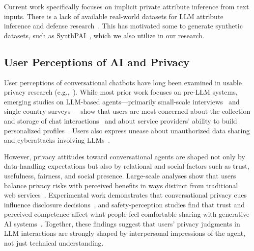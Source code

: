 Current work specifically focuses on implicit private attribute inference from text inputs. There is a lack of available real-world datasets for LLM attribute inference and defense research~\cite{staab2024beyond}. %
This has motivated some to generate synthetic datasets, such as SynthPAI~\cite{synthpai}, which we also utilize in our research. 


\subsection{User Perceptions of AI and Privacy}
User perceptions of conversational chatbots have long been examined in usable privacy research (e.g.,~\cite{chalhoub2020alexa, chametka2023security, belen2021privacy, ma2025privacy, zufferey2025ai}). While most prior work focuses on pre-LLM systems, emerging studies on LLM-based agents—primarily small-scale interviews~\cite{kimbel2024security, zhang2024s} and single-country surveys~\cite{malki2025hoovered, liu2025prevalence}—show that users are most concerned about the collection and storage of chat interactions~\cite{belen2021privacy, chametka2023security, kimbel2024security, zhang2024s, zhang2025understanding} and about service providers’ ability to build personalized profiles~\cite{liu2025prevalence, rescriber}. Users also express unease about unauthorized data sharing and cyberattacks involving LLMs~\cite{alawida2024unveiling, alkamli2024understanding}.

However, privacy attitudes toward conversational agents are shaped not only by data-handling expectations but also by relational and social factors such as trust, usefulness, fairness, and social presence. Large-scale analyses show that users balance privacy risks with perceived benefits in ways distinct from traditional web services~\cite{liu2024understanding}. Experimental work demonstrates that conversational privacy cues influence disclosure decisions~\cite{Leschanowsky2023}, and safety-perception studies find that trust and perceived competence affect what people feel comfortable sharing with generative AI systems~\cite{tolsdorf2025safety}. Together, these findings suggest that users’ privacy judgments in LLM interactions are strongly shaped by interpersonal impressions of the agent, not just technical understanding.

